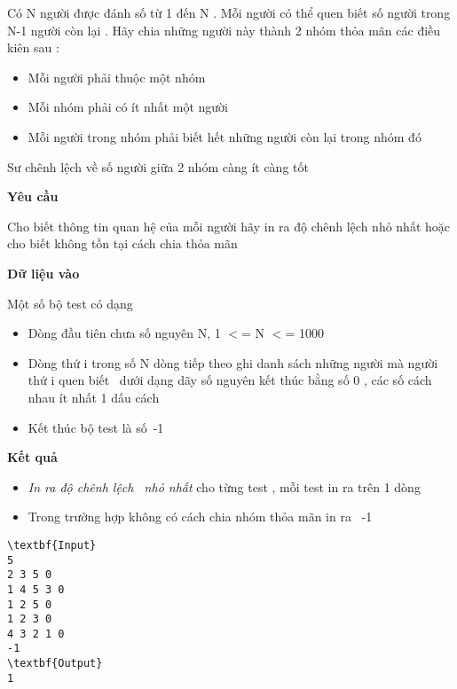 

Có N người được đánh số từ 1 đến N . Mỗi người có thể quen biết số người trong N-1 người còn lại . Hãy chia những người này thành 2 nhóm thỏa mãn các điều kiên sau :
\begin{itemize}
	\item Mỗi người phải thuộc một nhóm
	\item Mỗi nhóm phải có ít nhất một người
	\item Mỗi người trong nhóm phải biết hết những người còn lại trong nhóm đó
\end{itemize}

Sư chênh lệch về số người giữa 2 nhóm càng ít càng tốt

\textbf{Yêu cầu}

Cho biết thông tin quan hệ của mỗi người hãy in ra độ chênh lệch nhỏ nhất hoặc cho biết không tồn tại cách chia thỏa mãn

\textbf{Dữ liệu vào}

Một số bộ test có dạng
\begin{itemize}
	\item Dòng đầu tiên chưa số nguyên N, 1 $<$= N $<$= 1000
	\item Dòng thứ i trong số N dòng tiếp theo ghi danh sách những người mà người thứ i quen biết  dưới dạng dãy số nguyên kết thúc bằng số 0 , các số cách nhau ít nhất 1 dấu cách
	\item Kết thúc bộ test là số -1
\end{itemize}

\textbf{Kết quả }
\begin{itemize}
	\item \emph{In ra độ chênh lệch  nhỏ nhất } cho từng test , mỗi test in ra trên 1 dòng
	\item Trong trường hợp không có cách chia nhóm thỏa mãn in ra  -1
\end{itemize}
\begin{verbatim}
\textbf{Input}
5
2 3 5 0
1 4 5 3 0
1 2 5 0
1 2 3 0
4 3 2 1 0
-1
\textbf{Output}
1\end{verbatim}